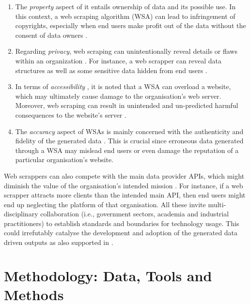 \documentclass[a4paper, 10pt, conference]{ieeeconf}      %
\begin{document}
\begin{enumerate}
    \item The  \emph{property} aspect of it entails ownership of data and its possible use. %
    In this context,  a web scraping algorithm (WSA)  can lead to infringement of copyrights, especially  when end users make profit out of the  data without the consent of data owners \cite{dreyer2013internet}.
    \item Regarding \emph{privacy},  web scraping can unintentionally reveal  details or  flaws within an organization \cite{mason1986four}. For instance, a web scrapper can reveal data structures as well as some sensitive data hidden from end users \cite{ives2006anything}. 
    \item  In terms of \emph{accessibility} \cite{mason1986four}, it is noted that a WSA can overload a website, which may ultimately   cause damage to the organisation's  web server. Moreover, web scraping can result in unintended and un-predicted harmful consequences to   the website's server \cite{krotov2020tutorial}.  
    
    \item The \emph{accuracy} aspect of WSAs is mainly concerned with  the authenticity and fidelity of the generated data \cite{mason1986four}. This is crucial since erroneous data generated through a WSA may   mislead   end users or even damage the reputation of a particular organisation's  website.
\end{enumerate}
Web scrappers can  also compete with the main data provider APIs, %
which might diminish  the value of the organisation's intended mission
\cite{hirschey2014symbiotic}.  For instance, if a   web scrapper  attracts more clients than the  intended main API, then end users might end up neglecting the  platform of that   organisation.  %
All these invite multi-disciplinary collaboration  (i.e., government sectors, academia and industrial practitioners)  to establish 
  standards  and boundaries for technology usage. This could irrefutably catalyse the development and adoption of the generated data driven outputs as also supported in \cite{fundel2019promoting,katz2005economic}.
  \newpage
\section{\textbf{Methodology: Data, Tools and Methods}}
	\label{Mtods}
\end{document}
